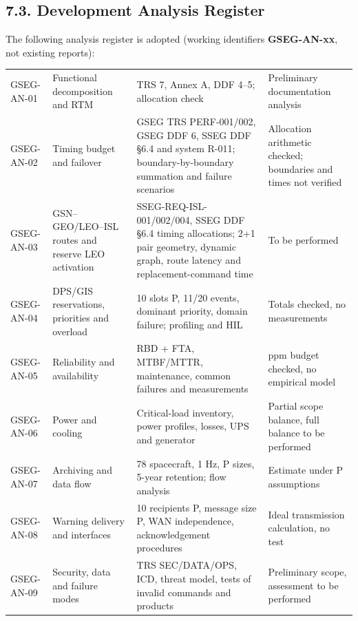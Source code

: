 \subsection{7.3. Development Analysis Register}\label{ddjf-7-3}

The following analysis register is adopted (working identifiers \textbf{GSEG-AN-xx}, not existing reports):

\begingroup{}
\begin{longtable}{|P{0.13}|P{0.24}|P{0.35}|P{0.28}|}
\hline{}
 &  &  & \\ \hline
\endhead
\hline\endlastfoot
GSEG-AN-01 & Functional decomposition and RTM & TRS 7, Annex A, DDF 4–5; allocation check & Preliminary documentation analysis\\ \hline
GSEG-AN-02 & Timing budget and failover & GSEG TRS PERF-001/\allowbreak{}002, GSEG DDF 6, SSEG DDF §6.4 and system R-011; boundary-by-boundary summation and failure scenarios & Allocation arithmetic checked; boundaries and times not verified\\ \hline
GSEG-AN-03 & GSN–GEO/\allowbreak{}LEO–ISL routes and reserve LEO activation & SSEG-REQ-ISL-001/\allowbreak{}002/\allowbreak{}004, SSEG DDF §6.4 timing allocations; 2+1 pair geometry, dynamic graph, route latency and replacement-command time & To be performed\\ \hline
GSEG-AN-04 & DPS/\allowbreak{}GIS reservations, priorities and overload & 10 slots P, 11/\allowbreak{}20 events, dominant priority, domain failure; profiling and HIL & Totals checked, no measurements\\ \hline
GSEG-AN-05 & Reliability and availability & RBD + FTA, MTBF/\allowbreak{}MTTR, maintenance, common failures and measurements & ppm budget checked, no empirical model\\ \hline
GSEG-AN-06 & Power and cooling & Critical-load inventory, power profiles, losses, UPS and generator & Partial scope balance, full balance to be performed\\ \hline
GSEG-AN-07 & Archiving and data flow & 78 spacecraft, 1 Hz, P sizes, 5-year retention; flow analysis & Estimate under P assumptions\\ \hline
GSEG-AN-08 & Warning delivery and interfaces & 10 recipients P, message size P, WAN independence, acknowledgement procedures & Ideal transmission calculation, no test\\ \hline
GSEG-AN-09 & Security, data and failure modes & TRS SEC/\allowbreak{}DATA/\allowbreak{}OPS, ICD, threat model, tests of invalid commands and products & Preliminary scope, assessment to be performed\\*
\end{longtable}
\endgroup

